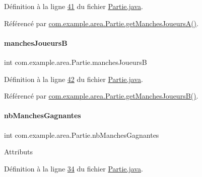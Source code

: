 Définition à la ligne \hyperlink{_partie_8java_source_l00041}{41} du fichier \hyperlink{_partie_8java_source}{Partie.\+java}.



Référencé par \hyperlink{_partie_8java_source_l00096}{com.\+example.\+area.\+Partie.\+get\+Manches\+Joueurs\+A()}.

\mbox{\label{classcom_1_1example_1_1area_1_1_partie_a9bb9a60be0b966b5a8bd5ac0934387bf}} 
\paragraph{\texorpdfstring{manches\+JoueursB}{manchesJoueursB}}
{\footnotesize\ttfamily int com.\+example.\+area.\+Partie.\+manches\+JoueursB\hspace{0.3cm}{\ttfamily [private]}}



Définition à la ligne \hyperlink{_partie_8java_source_l00042}{42} du fichier \hyperlink{_partie_8java_source}{Partie.\+java}.



Référencé par \hyperlink{_partie_8java_source_l00104}{com.\+example.\+area.\+Partie.\+get\+Manches\+Joueurs\+B()}.

\mbox{\label{classcom_1_1example_1_1area_1_1_partie_a1d1d6ce602fecf229217fe3d7a4d9152}} 
\paragraph{\texorpdfstring{nb\+Manches\+Gagnantes}{nbManchesGagnantes}}
{\footnotesize\ttfamily int com.\+example.\+area.\+Partie.\+nb\+Manches\+Gagnantes\hspace{0.3cm}{\ttfamily [private]}}

Attributs 

Définition à la ligne \hyperlink{_partie_8java_source_l00034}{34} du fichier \hyperlink{_partie_8java_source}{Partie.\+java}.



